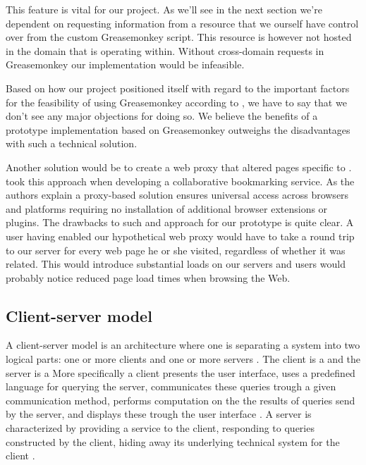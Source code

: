 This feature is vital for our project. As we'll see in the next section we're
dependent on requesting information from a resource that we ourself have
control over from the custom Greasemonkey script. This resource is however
not hosted in the domain that \urort{} is operating within. Without
cross-domain requests in Greasemonkey our implementation would be infeasible.

Based on how our project positioned itself with regard to the important
factors for the feasibility of using Greasemonkey
according to \citet{laird07}, we have to say that we
don't see any major objections for doing so.
We believe the benefits of a prototype implementation
based on Greasemonkey outweighs the disadvantages with such a technical
solution.

Another solution would be to create a web proxy that altered pages specific to
\urort{}. \citet[]{keller97} took this approach when developing
a collaborative bookmarking service. As the authors explain a proxy-based
solution ensures universal access across browsers and platforms requiring no
installation of additional browser extensions or plugins. The drawbacks to
such and approach for our prototype is quite clear. A user having enabled
our hypothetical web proxy would have to take a round trip to our server for
every web page he or she visited, regardless of whether it was \urort{}
related. This would introduce substantial loads on our servers and users would
probably notice reduced page load times when browsing the Web.

\subsection{Client-server model}

A client-server model is an architecture where one is separating a system into
two logical parts:
one or more clients and one or more servers \citep[]{lewandowski98}.
The client is a 
and the server is a 
More specifically a client presents the user interface, uses a predefined
language for querying the server, communicates these queries trough a given
communication method, performs computation on the the results of queries send
by the server, and displays these trough the user interface
\citep[]{sinha92}. A server is characterized by providing a service
to the client, responding to queries constructed by the client,
hiding away its underlying technical system for the client
\citep[]{sinha92}.


